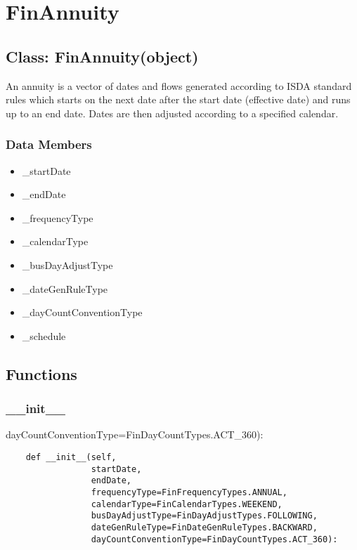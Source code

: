 \documentclass[twoside,11pt]{book}
\begin{document}
\section{FinAnnuity}

\subsection*{Class: FinAnnuity(object)}
An annuity is a vector of dates and flows generated according to ISDA  standard rules which starts on the next date after the start date  (effective date) and runs up to an end date. Dates are then adjusted  according to a specified calendar.  

\subsubsection*{Data Members}
\begin{itemize}
\item{\_startDate}
\item{\_endDate}
\item{\_frequencyType}
\item{\_calendarType}
\item{\_busDayAdjustType}
\item{\_dateGenRuleType}
\item{\_dayCountConventionType}
\item{\_schedule}
\end{itemize}

\subsection*{Functions}

\subsubsection*{{\bf \_\_init\_\_}}
dayCountConventionType=FinDayCountTypes.ACT\_360): 

\begin{lstlisting}
    def __init__(self,
                 startDate,
                 endDate,
                 frequencyType=FinFrequencyTypes.ANNUAL,
                 calendarType=FinCalendarTypes.WEEKEND,
                 busDayAdjustType=FinDayAdjustTypes.FOLLOWING,
                 dateGenRuleType=FinDateGenRuleTypes.BACKWARD,
                 dayCountConventionType=FinDayCountTypes.ACT_360):
\end{lstlisting}
\end{document}
